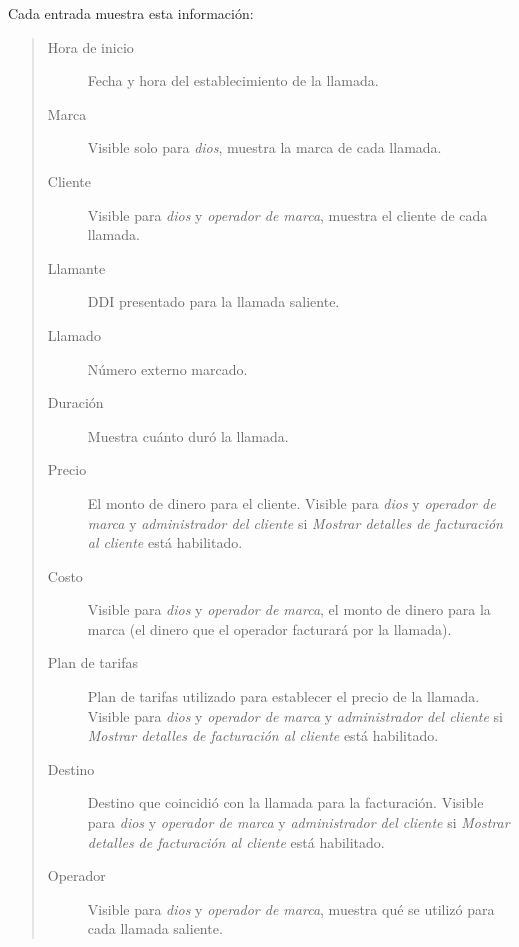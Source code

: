 \documentclass[letterpaper,10pt,spanish]{sphinxmanual}
\begin{document}
Cada entrada muestra esta información:
\begin{quote}
\begin{description}
\item[{Hora de inicio}] \leavevmode
Fecha y hora del establecimiento de la llamada.

\item[{Marca}] \leavevmode
Visible solo para \emph{dios}, muestra la marca de cada llamada.

\item[{Cliente}] \leavevmode
Visible para \emph{dios} y \emph{operador de marca}, muestra el cliente de cada llamada.

\item[{Llamante}] \leavevmode
DDI presentado para la llamada saliente.

\item[{Llamado}] \leavevmode
Número externo marcado.

\item[{Duración}] \leavevmode
Muestra cuánto duró la llamada.

\item[{Precio}] \leavevmode
El monto de dinero para el cliente. Visible para \emph{dios} y \emph{operador de marca} y \emph{administrador del cliente} si \emph{Mostrar detalles de facturación al cliente} está habilitado.

\item[{Costo}] \leavevmode
Visible para \emph{dios} y \emph{operador de marca}, el monto de dinero para la marca (el dinero que el operador facturará por la llamada).

\item[{Plan de tarifas}] \leavevmode
Plan de tarifas utilizado para establecer el precio de la llamada. Visible para \emph{dios} y \emph{operador de marca} y \emph{administrador del cliente} si \emph{Mostrar detalles de facturación al cliente} está habilitado.

\item[{Destino}] \leavevmode
Destino que coincidió con la llamada para la facturación. Visible para \emph{dios} y \emph{operador de marca} y \emph{administrador del cliente} si \emph{Mostrar detalles de facturación al cliente} está habilitado.

\item[{Operador}] \leavevmode
Visible para \emph{dios} y \emph{operador de marca}, muestra qué {\hyperref[administration_portal/brand/providers/carriers:carriers]{}} se utilizó para cada llamada saliente.


\end{description}
\end{quote}
\end{document}
